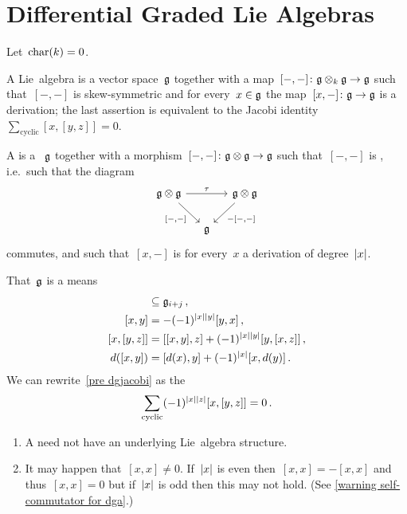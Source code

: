 \documentclass[a4paper,10pt,headings=standardclasses]{scrartcl}
\begin{document}
\section{Differential Graded Lie Algebras}

Let~$\operatorname{char}(k) = 0$.

\begin{recall}
  A Lie~algebra is a vector space~$\mathfrak{g}$ together with a map~$[-,-] \colon \mathfrak{g} \otimes_k \mathfrak{g} \to \mathfrak{g}$ such that~$[-,-]$ is skew-symmetric and for every~$x \in \mathfrak{g}$ the map~$[x,-] \colon \mathfrak{g} \to \mathfrak{g}$ is a derivation;
  the last assertion is equivalent to the Jacobi identity~$\sum_{\text{cyclic}} [x,[y,z]] = 0$.
\end{recall}

\begin{definition}
  A  is a {\dgv}~$\mathfrak{g}$ together with a morphism~$[-,-] \colon \mathfrak{g} \otimes \mathfrak{g} \to \mathfrak{g}$ such that~$[-,-]$ is , i.e.\ such that the diagram
  \[
    \begin{tikzcd}[column sep = small]
      \glie \tensor \glie
      \arrow{rr}[above]{\tau}
      \arrow{dr}[below left]{[-,-]}
      &
      {}
      &
      \glie \tensor \glie
      \arrow{dl}[below right]{-[-,-]}
      \\
      {}
      &
      \glie
      &
      {}
    \end{tikzcd}
  \]
  commutes, and such that~$[x,-]$ is for every~$x$ a derivation of degree~$\lvert x\rvert$.
\end{definition}

\begin{remark}
  That~$\mathfrak{g}$ is a {\dgl} means
  \begin{align}
    [\glie_i, \glie_j]
    &\subseteq
    \glie_{i+j} \,,
    \notag
  \\
    [x,y]
    &=
    -(-1)^{\hdeg{x} \hdeg{y}} [y,x] \,,
    \notag
  \\
    [x, [y,z]]
    &=
    [[x,y], z]
    +
    (-1)^{\hdeg{x} \hdeg{y}}
    [y, [x,z]] \,,
    \label{pre dgjacobi}
  \\
    d([x,y])
    &=
    [d(x), y] + (-1)^{\hdeg{x}} [x, d(y)] \,.
    \notag
  \end{align}
  We can rewrite~\eqref{pre dgjacobi} as the 
  \[
    \sum_{\text{cyclic}}
    (-1)^{\lvert x\rvert \lvert z\rvert} [x, [y,z]]
    =
    0 \,.
  \]
\end{remark}

\begin{warning}
  \leavevmode
  \begin{enumerate}
    \item
      A {\dgl} need not have an underlying Lie~algebra structure.
    \item
      It may happen that~$[x,x] \neq 0$.
      If~$\lvert x\rvert$ is even then~$[x,x] = -[x,x]$ and thus~$[x,x] = 0$ but if~$\lvert x\rvert$ is odd then this may not hold.
      (See \cref{warning self-commutator for dga}.)
  \end{enumerate}
\end{warning}
\end{document}
